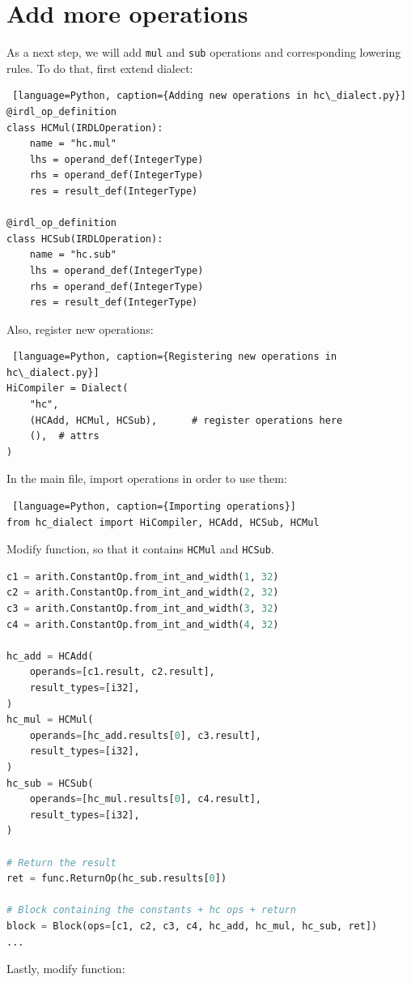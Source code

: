 \documentclass[../main.tex]{subfiles}
\begin{document}
\section{Add more operations}
As a next step, we will add \texttt{mul} and \texttt{sub} operations and corresponding lowering rules. To do that, first extend dialect:
\begin{lstlisting} [language=Python, caption={Adding new operations in hc\_dialect.py}]
@irdl_op_definition
class HCMul(IRDLOperation):
    name = "hc.mul"
    lhs = operand_def(IntegerType)
    rhs = operand_def(IntegerType)
    res = result_def(IntegerType)

@irdl_op_definition
class HCSub(IRDLOperation):
    name = "hc.sub"
    lhs = operand_def(IntegerType)
    rhs = operand_def(IntegerType)
    res = result_def(IntegerType)
\end{lstlisting}
Also, register new operations:
\begin{lstlisting} [language=Python, caption={Registering new operations in hc\_dialect.py}]
HiCompiler = Dialect(
    "hc",
    (HCAdd, HCMul, HCSub),      # register operations here
    (),  # attrs
)
\end{lstlisting}
In the main file, import operations in order to use them:
\begin{lstlisting} [language=Python, caption={Importing operations}]
from hc_dialect import HiCompiler, HCAdd, HCSub, HCMul
\end{lstlisting}
Modify  function, so that it contains \texttt{HCMul} and \texttt{HCSub}.
\begin{lstlisting}[language=Python, caption={build context snippet}]
c1 = arith.ConstantOp.from_int_and_width(1, 32)
c2 = arith.ConstantOp.from_int_and_width(2, 32)
c3 = arith.ConstantOp.from_int_and_width(3, 32)
c4 = arith.ConstantOp.from_int_and_width(4, 32)

hc_add = HCAdd(
    operands=[c1.result, c2.result],
    result_types=[i32],
)
hc_mul = HCMul(
    operands=[hc_add.results[0], c3.result],
    result_types=[i32],
)
hc_sub = HCSub(
    operands=[hc_mul.results[0], c4.result],
    result_types=[i32],
)

# Return the result
ret = func.ReturnOp(hc_sub.results[0])

# Block containing the constants + hc ops + return
block = Block(ops=[c1, c2, c3, c4, hc_add, hc_mul, hc_sub, ret])
...
\end{lstlisting}
Lastly, modify  function:
\end{document}

